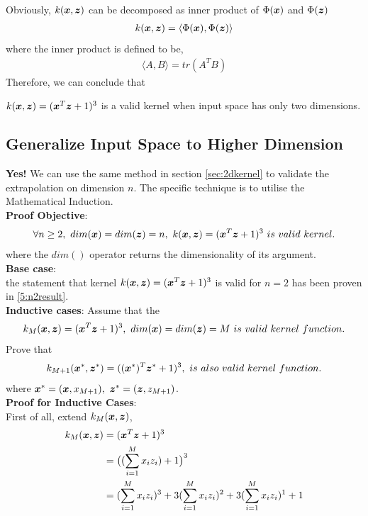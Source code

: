 \documentclass[11pt,a4paper]{article}
\newcommand{\htab}{\hspace*{0.63cm}}
\newcommand{\pg}{\\[0.3cm]}
\begin{document}
\htab Obviously, $k(\boldsymbol{x},\boldsymbol{z})$ can be decomposed as inner product of $\Phi(\boldsymbol{x})$ and $\Phi(\boldsymbol{z})$
    \begin{align} \label{5:n2result}
        k(\boldsymbol{x},\boldsymbol{z}) = \langle \Phi(\boldsymbol{x}), \Phi(\boldsymbol{z}) \rangle
    \end{align}
\htab where the inner product is defined to be,
    \begin{align}
        \langle A, B\rangle = tr (A^{T} B) \label{5:innerprod}
    \end{align}
\htab Therefore, we can conclude that 
    \begin{center}    
        $k(\boldsymbol{x},\boldsymbol{z}) = (\boldsymbol{x}^{T} \boldsymbol{z} + 1)^{3} $ is a valid kernel when input space has only two dimensions. 
    \end{center}
\newpage
\subsection{Generalize Input Space to Higher Dimension} \label{sec:ngene}
\htab \textbf{Yes!} We can use the same method in section \ref{sec:2dkernel} to validate the extrapolation on dimension $n$. The specific technique is to utilise the Mathematical Induction. \pg
\htab \textbf{Proof Objective}: 
    \begin{equation}
    \forall n \geq 2,\ dim(\boldsymbol{x}) = dim(\boldsymbol{z}) = n,\ k(\boldsymbol{x},\boldsymbol{z}) = (\boldsymbol{x}^{T} \boldsymbol{z} + 1)^{3} \ is \ valid\ kernel.
    \end{equation}
\htab \htab where the $dim()$ operator returns the dimensionality of its argument. \pg
\htab \textbf{Base case}: \\ 
\htab \htab the statement that kernel $k(\boldsymbol{x},\boldsymbol{z}) = (\boldsymbol{x}^{T} \boldsymbol{z} + 1)^{3}$ is valid
    for $n = 2$ has been proven in \eqref{5:n2result}. \pg
\htab \textbf{Inductive cases}: Assume that the 
    \begin{equation}    \label{5:assume}
        \kold = (\xx^{T} \zz + 1)^{3},\ dim(\xx) = dim(\zz) = M\ is\ valid\ kernel\ function.
    \end{equation}
\htab Prove that 
    \begin{equation}
        \knew = ((\xxp)^{T} \zzp + 1)^{3},\ is\ also\ valid\ kernel\ function. \label{5:inductive}
    \end{equation}
    \htab \htab where $\boldsymbol{x}^{*} = (\boldsymbol{x}, x_{M+1}),\ \boldsymbol{z}^{*} = (\boldsymbol{z}, z_{M+1})$.\\[0.2cm]
\htab \textbf{Proof for Inductive Cases}:\\
\htab First of all, extend $k_{M}(\boldsymbol{x},\boldsymbol{z})$,
    \begin{align} 
        k_{M}(\boldsymbol{x},\boldsymbol{z}) &= (\boldsymbol{x}^{T} \boldsymbol{z} + 1)^{3} \\
              &= \big( (\sum_{i=1}^{M} x_{i} z_{i}) + 1\big)^{3} \\
              &= (\sum_{i=1}^{M} x_{i} z_{i})^{3} + 3(\sum_{i=1}^{M} x_{i} z_{i})^{2} + 3(\sum_{i=1}^{M} x_{i} z_{i})^{1} + 1 
        \end{align}
\end{document}
